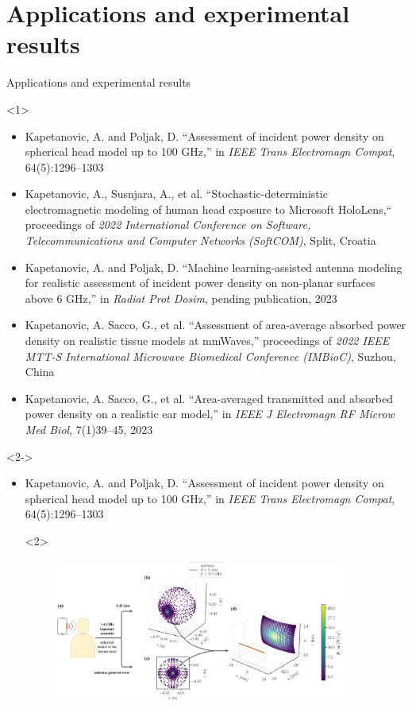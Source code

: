 \documentclass[xcolor=dvipsnames,10pt]{beamer}
\begin{document}
\section{Applications and experimental results}

\begin{frame}{Applications and experimental results}
    \begin{onlyenv}<1>
        \begin{itemize}
            \item Kapetanovic, A. and Poljak, D. ``Assessment of incident power density on spherical head model up to 100 GHz,'' in \textit{IEEE Trans Electromagn Compat}, 64(5):1296--1303
            \item Kapetanovic, A., Susnjara, A., et al. ``Stochastic-deterministic electromagnetic modeling of human head exposure to Microsoft HoloLens,`` proceedings of \textit{2022 International Conference on Software, Telecommunications and Computer Networks (SoftCOM)}, Split, Croatia
            \item Kapetanovic, A. and Poljak, D. ``Machine learning-assisted antenna modeling for realistic assessment of incident power density on non-planar surfaces above 6 GHz,'' in \textit{Radiat Prot Dosim}, pending publication, 2023
            \item Kapetanovic, A. Sacco, G., et al. ``Assessment of area-average absorbed power density on realistic tissue models at mmWaves,'' proceedings of \textit{2022 IEEE MTT-S International Microwave Biomedical Conference (IMBioC)}, Suzhou, China
            \item Kapetanovic, A. Sacco, G., et al. ``Area-averaged transmitted and absorbed power density on a realistic ear model,'' in \textit{IEEE J Electromagn RF Microw Med Biol}, 7(1)39--45, 2023
        \end{itemize}
    \end{onlyenv}
    \begin{onlyenv}<2->
        \begin{itemize}
            \item<only@2,3> Kapetanovic, A. and Poljak, D. ``Assessment of incident power density on spherical head model up to 100 GHz,'' in \textit{IEEE Trans Electromagn Compat}, 64(5):1296--1303
            \begin{onlyenv}<2>
                \begin{figure}
                    \centering
                    \includegraphics[width=0.9\textwidth]{figures/Kapetanovic2022TEMC.pdf}

\end{figure}
\end{onlyenv}
\end{itemize}
\end{onlyenv}
\end{frame}
\end{document}
